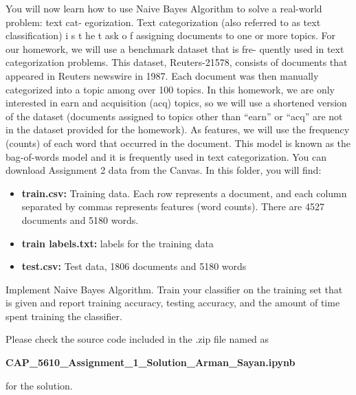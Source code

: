 \documentclass[12pt,letterpaper, onecolumn]{exam}
\begin{document}
\begin{questions}
    You will now learn how to use Naive Bayes Algorithm to solve a real-world problem: text cat-
    egorization. Text categorization (also referred to as text classification) i s t he t ask o f assigning
    documents to one or more topics. For our homework, we will use a benchmark dataset that is fre-
    quently used in text categorization problems. This dataset, Reuters-21578, consists of documents that
    appeared in Reuters newswire in 1987. Each document was then manually categorized into a topic
    among over 100 topics. In this homework, we are only interested in earn and acquisition (acq) topics,
    so we will use a shortened version of the dataset (documents assigned to topics other than “earn” or
    “acq” are not in the dataset provided for the homework). As features, we will use the frequency
    (counts) of each word that occurred in the document. This model is known as the bag-of-words model
    and it is frequently used in text categorization. You can download Assignment 2 data from the Canvas.
    In this folder, you will find:

    \begin{itemize}
        \item \textbf{train.csv:} Training data. Each row represents a document, and each column separated by
        commas represents features (word counts). There are 4527 documents and 5180 words.
        \item \textbf{train labels.txt:} labels for the training data
        \item \textbf{test.csv:} Test data, 1806 documents and 5180 words
    \end{itemize}

    Implement Naive Bayes Algorithm. Train your classifier on the training set that is given and report training accuracy, testing accuracy, and the amount of time spent training the classifier.

    \begin{solution}
        Please check the source code included in the .zip file named as

        \begin{center}
            \textbf{CAP\_5610\_Assignment\_1\_Solution\_Arman\_Sayan.ipynb}
        \end{center}
        
        for the solution.
    \end{solution}

    \pagebreak
    
\end{questions}
\end{document}
